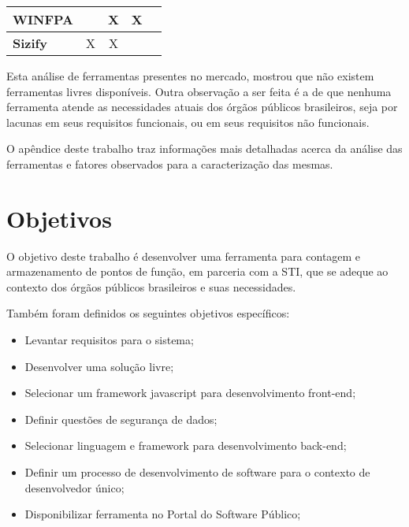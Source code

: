 \begin{table}[]
{\begin{tabular}{|l|c|c|c|c|}
\textbf{WINFPA}                                                              &                               & X                                                                                 & X                           &                              \\ \hline
\textbf{Sizify}                                                              & X                             & X                                                                                 &                             &                              \\ \hline
\end{tabular}
}
\end{table}

Esta análise de ferramentas presentes no mercado, mostrou que não existem ferramentas livres disponíveis. Outra observação a ser feita é a de que nenhuma ferramenta atende as necessidades atuais dos órgãos públicos brasileiros, seja por lacunas em seus requisitos funcionais, ou em seus requisitos não funcionais.

O apêndice  deste trabalho traz informações mais detalhadas acerca da análise das ferramentas e fatores observados para a caracterização das mesmas.


\section{Objetivos}

O objetivo deste  trabalho é desenvolver uma ferramenta para contagem e
armazenamento de pontos de função, em parceria com a STI, que se adeque ao
contexto dos órgãos públicos brasileiros e suas necessidades.

Também foram definidos os seguintes objetivos específicos:

\begin{itemize}

  \item Levantar requisitos para o sistema;

  \item Desenvolver uma solução livre;

  \item Selecionar um framework javascript para desenvolvimento front-end;

  \item  Definir questões de segurança de dados;

  \item Selecionar linguagem e framework para desenvolvimento back-end;

  \item Definir um processo de desenvolvimento de software para o contexto de
  desenvolvedor único;

  \item Disponibilizar ferramenta no Portal do Software Público;

\end{itemize}

